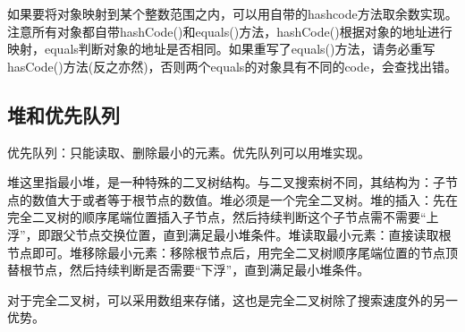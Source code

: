 \documentclass{article}
\begin{document}
	如果要将对象映射到某个整数范围之内，可以用自带的hashcode方法取余数实现。注意所有对象都自带hashCode()和equals()方法，hashCode()根据对象的地址进行映射，equals判断对象的地址是否相同。如果重写了equals()方法，请务必重写hasCode()方法(反之亦然)，否则两个equals的对象具有不同的code，会查找出错。
	\subsection{堆和优先队列}
	优先队列：只能读取、删除最小的元素。优先队列可以用堆实现。
	
	堆这里指最小堆，是一种特殊的二叉树结构。与二叉搜索树不同，其结构为：子节点的数值大于或者等于根节点的数值。堆必须是一个完全二叉树。堆的插入：先在完全二叉树的顺序尾端位置插入子节点，然后持续判断这个子节点需不需要“上浮”，即跟父节点交换位置，直到满足最小堆条件。堆读取最小元素：直接读取根节点即可。堆移除最小元素：移除根节点后，用完全二叉树顺序尾端位置的节点顶替根节点，然后持续判断是否需要“下浮”，直到满足最小堆条件。
	
	对于完全二叉树，可以采用数组来存储，这也是完全二叉树除了搜索速度外的另一优势。
\end{document}
